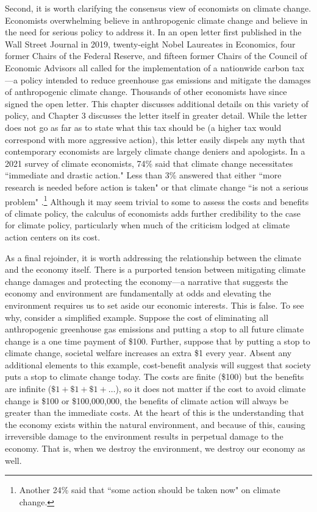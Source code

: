 Second, it is worth clarifying the consensus view of economists on climate change. Economists overwhelming believe in anthropogenic climate change and believe in the need for serious policy to address it. In an open letter first published in the Wall Street Journal in 2019, twenty-eight Nobel Laureates in Economics, four former Chairs of the Federal Reserve, and fifteen former Chairs of the Council of Economic Advisors all called for the implementation of a nationwide carbon tax---a policy intended to reduce greenhouse gas emissions and mitigate the damages of anthropogenic climate change. Thousands of other economists have since signed the open letter. This chapter discusses additional details on this variety of policy, and Chapter 3 discusses the letter itself in greater detail. While the letter does not go as far as to state what this tax should be (a higher tax would correspond with more aggressive action), this letter easily dispels any myth that contemporary economists are largely climate change deniers and apologists. In a 2021 survey of climate economists, 74\% said that climate change necessitates ``immediate and drastic action." Less than 3\% answered that either ``more research is needed before action is taken" or that climate change ``is not a serious problem" \citep{howard2021gauging}.\footnote{Another 24\% said that ``some action should be taken now" on climate change.} Although it may seem trivial to some to assess the costs and benefits of climate policy, the calculus of economists adds further credibility to the case for climate policy, particularly when much of the criticism lodged at climate action centers on its cost. 

As a final rejoinder, it is worth addressing the relationship between the climate and the economy itself. There is a purported tension between mitigating climate change damages and protecting the economy---a narrative that suggests the economy and environment are fundamentally at odds and elevating the environment requires us to set aside our economic interests. This is false. To see why, consider a simplified example. Suppose the cost of eliminating all anthropogenic greenhouse gas emissions and putting a stop to all future climate change is a one time payment of \$100. Further, suppose that by putting a stop to climate change, societal welfare increases an extra \$1 every year. Absent any additional elements to this example, cost-benefit analysis will suggest that society puts a stop to climate change today. The costs are finite (\$100) but the benefits are infinite ($\$1  + \$1  + \$1 + \ldots$), so it does not matter if the cost to avoid climate change is \$100 or \$100,000,000, the benefits of climate action will always be greater than the immediate costs. At the heart of this is the understanding that the economy exists within the natural environment, and because of this, causing irreversible damage to the environment results in perpetual damage to the economy. That is, when we destroy the environment, we destroy our economy as well. 

